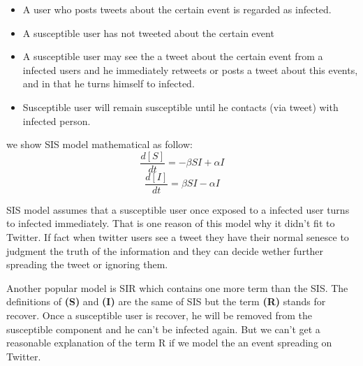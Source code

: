 \begin{itemize}
\item A user who posts tweets about the certain event is regarded as infected.
\item A susceptible user has not tweeted about the certain event
\item A susceptible user may see the a tweet about the certain event from a infected users and he immediately retweets or posts a tweet about this events, and in that he turns himself to infected.
\item Susceptible user will remain susceptible until he contacts (via tweet) with infected person.
\end{itemize}
we show SIS model mathematical as follow:
\begin{equation}
\frac{d[S]}{dt}=- \beta SI+\alpha I
\end{equation}
\begin{equation}
\frac{d[I]}{dt}= \beta SI-\alpha I
\end{equation}

SIS model assumes that a susceptible user once exposed to a infected user turns to infected immediately. That is one reason of this model why it didn't fit to Twitter. If fact when twitter users see a tweet they have their normal senesce to judgment the truth of the information and they can decide wether  further spreading the tweet or ignoring them.

Another popular model is SIR which contains one more term than the SIS. The definitions of \textbf{(S)} and \textbf{(I)} are the same of SIS but the term \textbf{(R)} stands for recover. Once a susceptible user is recover, he will be removed from the susceptible component and he can't be infected again. But we can't get a reasonable explanation of the term R if we model the an event spreading on Twitter.

